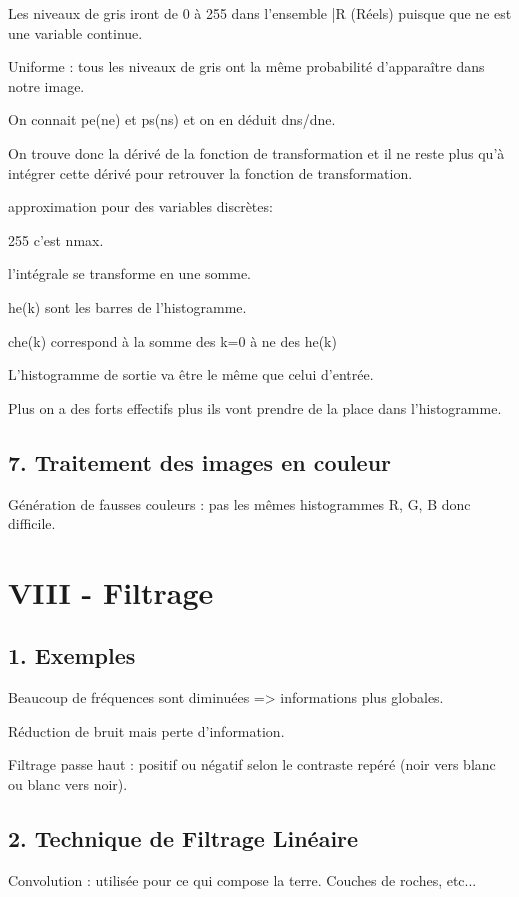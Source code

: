 \documentclass{report}
\begin{document}
Les niveaux de gris iront de 0 à 255 dans l'ensemble |R (Réels) puisque que ne est une variable continue.

Uniforme : tous les niveaux de gris ont la même probabilité d'apparaître dans notre image.

On connait pe(ne) et ps(ns) et on en déduit dns/dne. 

On trouve donc la dérivé de la fonction de transformation et il ne reste plus qu'à intégrer cette dérivé pour retrouver la fonction de transformation.

approximation pour des variables discrètes: 

255 c'est nmax.

l'intégrale se transforme en une somme.

he(k) sont les barres de l'histogramme.

che(k) correspond à la somme des k=0 à ne des he(k)

L'histogramme de sortie va être le même que celui d'entrée.

Plus on a des forts effectifs plus ils vont prendre de la place dans l'histogramme.

	\subsection*{7. Traitement des images en couleur}

Génération de fausses couleurs : pas les mêmes histogrammes R, G, B donc difficile.

	\section*{VIII - Filtrage}
	\subsection*{1. Exemples}

Beaucoup de fréquences sont diminuées => informations plus globales.

Réduction de bruit mais perte d'information.

Filtrage passe haut : positif ou négatif selon le contraste repéré (noir vers blanc ou blanc vers noir).

	\subsection*{2. Technique de Filtrage Linéaire}
Convolution : utilisée pour ce qui compose la terre. Couches de roches, etc...
\end{document}
